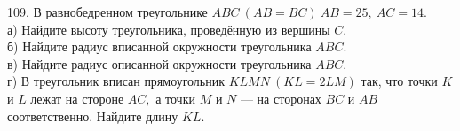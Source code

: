 109. В равнобедренном треугольнике $ABC\ (AB=BC)\ AB=25,\ AC=14.$\\
а) Найдите высоту треугольника, проведённую из вершины $C.$\\
б) Найдите радиус вписанной окружности треугольника $ABC.$\\
в) Найдите радиус описанной окружности треугольника $ABC.$\\
г) В треугольник вписан прямоугольник $KLMN\ (KL=2LM)$ так, что точки $K$ и $L$ лежат на стороне $AC,$ а точки $M$ и $N$ --- на сторонах $BC$ и $AB$ соответственно. Найдите длину $KL.$\\
